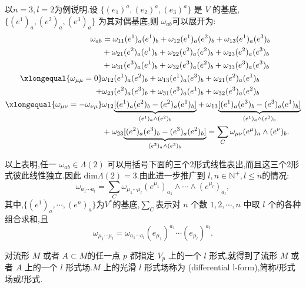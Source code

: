 \begin{remark}
以$n=3,l=2$为例说明.设 $\{(e_1)^a,(e_2)^a,(e_3)^a\}$ 是 $V$ 的基底,$\{(e^1)_a,(e^2)_a,(e^3)_a\}$ 为其对偶基底,则 $\omega_{ab}$可以展开为:
 $$
\begin{aligned}
\omega_{ab}&=\omega_{11}(e^1)_a(e^1)_b+\omega_{12}(e^1)_a(e^2)_b+\omega_{13}(e^1)_a(e^3)_b\\
&+\omega_{21}(e^2)_a(e^1)_b+\omega_{22}(e^2)_a(e^2)_b+\omega_{23}(e^2)_a(e^3)_b\\
&+\omega_{31}(e^3)_a(e^1)_b+\omega_{32}(e^3)_a(e^2)_b+\omega_{33}(e^3)_a(e^3)_b\\
\xlongequal{\omega_{\mu\mu}=0}&\omega_{12}(e^1)_a(e^2)_b+\omega_{13}(e^1)_a(e^3)_b+\omega_{21}(e^2)_a(e^1)_b\\
+&\omega_{23}(e^2)_a(e^3)_b+\omega_{31}(e^3)_a(e^1)_b+\omega_{32}(e^3)_a(e^2)_b\\
\xlongequal {\omega_{\mu\nu}=-\omega_{\nu\mu}}&\omega_{12}
\underset{(e^1)_a\wedge (e^2)_b}{\underbrace{[(e^1)_a(e^2)_b-(e^2)_a(e^1)_b]}}+\omega_{13}\underset{(e^1)_a\wedge (e^3)_b}{\underbrace{[(e^1)_a(e^3)_b-(e^3)_a(e^1)_b]}}\\
&+\omega_{23}\underset{(e^2)_a\wedge (e^3)_b}{\underbrace{[(e^2)_a(e^3)_b-(e^3)_a(e^2)_b]}}=\sum\limits_C \omega_{\mu\nu}(e^\mu)_a\wedge(e^\nu)_b.
\end{aligned}$$

以上表明,任一 $\omega_{ab}\in \Lambda(2)$ 可以用括号下面的三个2形式线性表出,而且这三个2形式彼此线性独立.因此 $\mathrm{dim}\Lambda(2)=3$.由此进一步推广到 $l,n\in \mathbb{N}^+,l\leqslant n$的情况:
$$\omega_{a_1\cdots a_l}=\sum\limits_C\omega_{\mu_1\cdots\mu_l}(e^{\mu_1})_{a_1}\wedge\cdots\wedge(e^{\mu_l})_{a_l},$$
其中,$\{(e^1)_a,\cdots,(e^n)_a\}$为$V^*$的基底,$\sum\limits_C$表示对 $n$ 个数 $1,2,\cdots,n$ 中取 $l$ 个的各种组合求和,且
$$\omega_{\mu_1\cdots\mu_l}=\omega_{a_1\cdots a_l}(e_{\mu_1})^{a_1}\cdots(e_{\mu_l})^{a_l}.$$
\end{remark}

对流形 $M$ 或者 $A\subset M$的任一点 $p$ 都指定 $V_p$ 上的一个 $l$ 形式,就得到了流形 $M$ 或者 $A$ 上的一个 $l$ 形式场.$M$ 上的光滑 $l$ 形式场称为 (differential l-form),简称$l$形式场或$l$形式.

